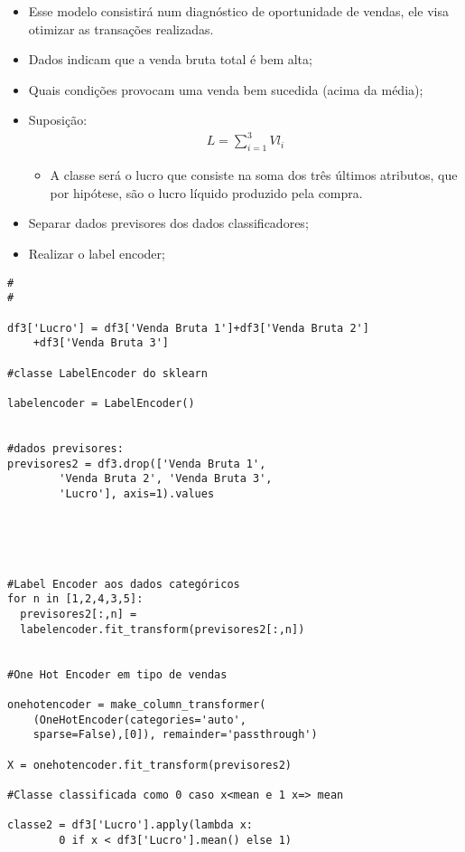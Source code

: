 \documentclass[compress]{beamer}
\begin{document}
\begin{frame}{}
    \begin{itemize}
        \item Esse modelo consistirá num diagnóstico de oportunidade de vendas, ele visa otimizar as transações realizadas.
        \item Dados indicam que a venda bruta total é bem alta;
        \item Quais condições provocam uma venda bem sucedida (acima da média);
        \item Suposição:
        \begin{align*}
            L=\sum_{i=1}^{3}{Vl}_i
        \end{align*}
            \begin{itemize}
                \item A classe será o lucro que consiste na soma dos três últimos atributos, que por hipótese, são o lucro líquido produzido pela compra.
            \end{itemize}
    \item Separar dados previsores dos dados classificadores;
    \item Realizar o label encoder;
    \end{itemize}
    
\end{frame}
\begin{verbatim}
#
#

df3['Lucro'] = df3['Venda Bruta 1']+df3['Venda Bruta 2']
    +df3['Venda Bruta 3']

#classe LabelEncoder do sklearn

labelencoder = LabelEncoder()


#dados previsores:
previsores2 = df3.drop(['Venda Bruta 1',
        'Venda Bruta 2', 'Venda Bruta 3',
        'Lucro'], axis=1).values





#Label Encoder aos dados categóricos
for n in [1,2,4,3,5]:
  previsores2[:,n] =
  labelencoder.fit_transform(previsores2[:,n])
  
  
#One Hot Encoder em tipo de vendas

onehotencoder = make_column_transformer(
    (OneHotEncoder(categories='auto',
    sparse=False),[0]), remainder='passthrough')

X = onehotencoder.fit_transform(previsores2)

#Classe classificada como 0 caso x<mean e 1 x=> mean

classe2 = df3['Lucro'].apply(lambda x:
        0 if x < df3['Lucro'].mean() else 1)
\end{verbatim}
\end{document}
